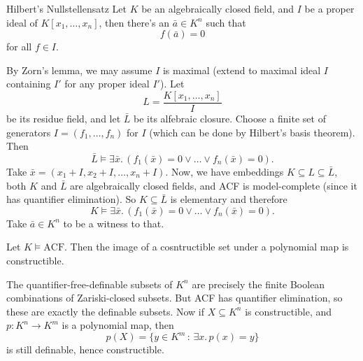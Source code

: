 \documentclass{article}
\numberwithin{thm}{subsection}
\begin{document}
\begin{corr}{Hilbert's Nullstellensatz}
    Let $K$ be an algebraically closed field, and $I$ be a proper ideal of $K[x_{1}, \dots, x_{n}]$, then there's an $\bar a \in K^{n}$ such that \[ f(\bar a) = 0\] for all $f \in I$.
\end{corr}
\proof By Zorn's lemma, we may assume $I$ is maximal (extend to maximal ideal $I$ containing $I'$ for any proper ideal $I'$). Let \[ L = \frac{K[x_{1}, \dots, x_{n}]}{I} \] be its residue field, and let $\bar L$ be its alfebraic closure. Choose a finite set of generators $I=(f_{1}, \dots, f_{n})$ for $I$ (which can be done by Hilbert's basis theorem). Then \[ \bar L \models \exists \bar x. \, (f_{1}(\bar x)=0 \vee \dots \vee f_{n}(\bar x)=0).\] Take $\bar x = (x_{1} + I, x_{2} + I, \dots, x_{n} + I)$. \gap
Now, we have embeddings $K \subseteq L \subseteq \bar L$, both $K$ and $\bar L$ are algebraically closed fields, and ACF is model-complete (since it has quantifier elimination). So $K \subseteq \bar L$ is elementary and therefore \[ K \models \exists \bar x. \, (f_{1}(\bar x)=0 \vee \dots \vee f_{n}(\bar x)=0).\] Take $\bar a \in K^{n}$ to be a witness to that. \endproof
\begin{corr}{}
    Let $K \models \text{ACF}$. Then the image of a cosntructible set under a polynomial map is constructible.
\end{corr}
\proof The quantifier-free-definable subsets of $K^{n}$ are precisely the finite Boolean combinations of Zariski-closed subsets. But ACF has quantifier elimination, so these are exactly the definable subsets. Now if $X \subseteq K^{n}$ is constructible, and $p: K^{n} \to K^{m}$ is a polynomial map, then \[ p(X) = \{ y \in K^{m} \, : \, \exists x. \, p(x)=y \} \] is still definable, hence constructible.
\endproof
\end{document}
